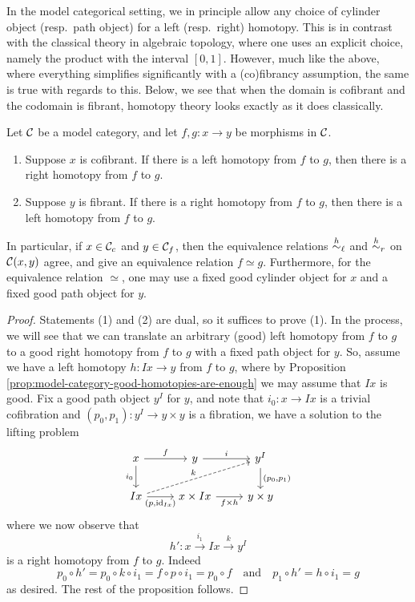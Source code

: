 In the model categorical setting, we in principle allow any choice of cylinder object (resp.\ path object) for a left (resp.\ right) homotopy. This is
in contrast with the classical theory in algebraic topology, where one uses an explicit choice, namely the product with the interval \([0,1]\). However,
much like the above, where everything simplifies significantly with a (co)fibrancy assumption, the same is true with regards to this. Below, we see that
when the domain is cofibrant and the codomain is fibrant, homotopy theory looks exactly as it does classically.

\begin{propositiondef}
	Let \(\mathcal{C}\) be a model category, and let \(f,g\!:x\to y\) be morphisms in \(\mathcal{C}\).
	\begin{enumerate}[label=(\arabic*)]
		\item Suppose \(x\) is cofibrant. If there is a left homotopy from \(f\) to \(g\), then there is a right homotopy from \(f\) to \(g\).
		\item Suppose \(y\) is fibrant. If there is a right homotopy from \(f\) to \(g\), then there is a left homotopy from \(f\) to \(g\).
	\end{enumerate}
	In particular, if \(x\in\mathcal{C}_c\) and \(y\in\mathcal{C}_f\), then the equivalence relations \(\overset{h}{\sim}_\ell\) and \(\overset{h}{\sim}_r\) on \(\mathcal{C}(x,y)\)
	agree, and give an equivalence relation \(f\simeq g\). Furthermore, for the equivalence relation \(\simeq\), one may use a fixed good cylinder
	object for \(x\) and a fixed good path object for \(y\).
\end{propositiondef}
\begin{proof}
Statements (1) and (2) are dual, so it suffices to prove (1). In the process, we will see that we can translate an arbitrary (good) left homotopy from \(f\) to \(g\)
to a good right homotopy from \(f\) to \(g\) with a fixed path object for \(y\). So, assume we have a left homotopy \(h\!:Ix\to y\) from \(f\) to \(g\), where by Proposition \ref{prop:model-category-good-homotopies-are-enough}
we may assume that \(Ix\) is good. Fix a good path object \(y^I\) for \(y\), and note that \(i_0\!:x\to Ix\) is a trivial cofibration and \((p_0,p_1)\!:y^I \to y\times y\)
is a fibration, we have  a solution to the lifting problem
\[
	\begin{tikzcd}
		x\ar[r,"f"]\ar[d,"i_0"'] & y \ar[r,"i"] & y^I\ar[d,"{(p_0,p_1)}"] \\
		Ix\ar[r,"{(p,\id_{Ix})}"']\ar[urr,dashed,"k"] & x\times Ix \ar[r,"{f\times h}"'] & y\times y
	\end{tikzcd}
\]
where we now observe that
\[ h'\!: x \overset{i_1}\to Ix \overset{k}\to y^I \]
is a right homotopy from \(f\) to \(g\). Indeed
\[ p_0\circ h' = p_0\circ k\circ i_1 = f\circ p\circ i_1 = p_0\circ f\quad\text{and}\quad p_1\circ h' = h\circ i_1 = g \]
as desired. The rest of the proposition follows.
\end{proof}

